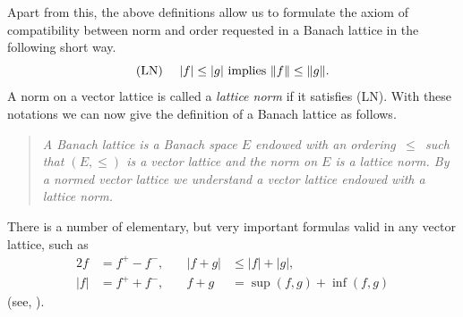 Apart from this, the above definitions allow us to formulate the axiom of compatibility between norm and order requested in a Banach lattice in the following short way.
\begin{equation*}\label{eq:c1-1}
	\text{(LN)} \quad \text{ $|f| \leq |g|$ implies $ \|f\| \leq \|g\| $.}   
\end{equation*}
A norm on a vector lattice is called a \emph{lattice norm} if it satisfies (LN).
With these notations we can now give the definition of a Banach lattice as follows.
\begin{quote}
\textit{A \emph{Banach lattice} is a Banach space $ E $ endowed with an ordering $ \,\leq\, $ such that $ (E,\leq) $ is a vector lattice and the norm on $ E $ is a lattice norm.
By a \emph{normed vector lattice} we understand a vector lattice endowed with a lattice norm.}
\end{quote}
There is a number of elementary, but very important formulas valid in any vector lattice, such as
\begin{alignat*}{2}
f &= f^{+} - f^{-} ,   &\quad |f + g| & \leq |f| + |g|, \\
|f| &= f^{+} + f^{-} , &\quad  f + g  & = \sup(f,g) + \inf(f,g)
\end{alignat*}
(see, \eg \textcite[Chap. II, §1]{schaefer:1974}).

